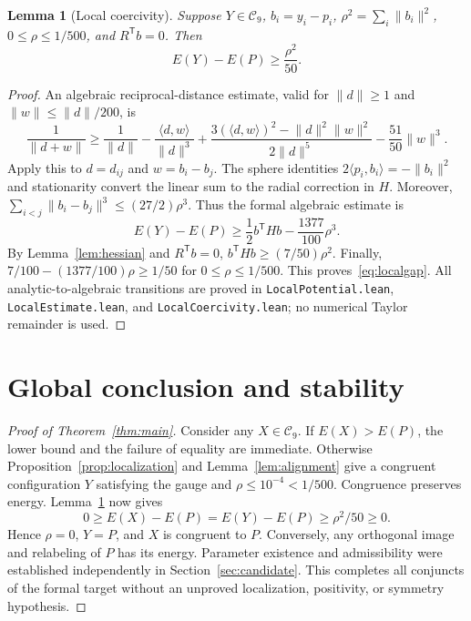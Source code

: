 \documentclass[11pt]{article}
\newtheorem{lemma}[theorem]{Lemma}
\theoremstyle{remark}
\newcommand{\ip}[2]{\langle #1,#2\rangle}
\newcommand{\norm}[1]{\lVert #1\rVert}
\newcommand{\pathcode}[1]{\nolinkurl{#1}}
\begin{document}
\begin{lemma}[Local coercivity]\label{lem:coercivity}
Suppose $Y\in\mathcal C_9$, $b_i=y_i-p_i$, $\rho^2=\sum_i\norm{b_i}^2$,
$0\le\rho\le1/500$, and $R^{\mathsf T}b=0$. Then
\begin{equation}\label{eq:localgap}
 E(Y)-E(P)\ge\frac{\rho^2}{50}.
\end{equation}
\end{lemma}
\begin{proof}
An algebraic reciprocal-distance estimate, valid for $\norm d\ge1$ and
$\norm w\le\norm d/200$, is
\[
 \frac1{\norm{d+w}}\ge\frac1{\norm{d}}-\frac{\ip{d}{w}}{\norm{d}^3}
 +\frac{3(\ip{d}{w})^2-\norm{d}^2\norm{w}^2}{2\norm{d}^5}
 -\frac{51}{50}\norm{w}^3.
\]
Apply this to $d=d_{ij}$ and $w=b_i-b_j$. The sphere identities
$2\ip{p_i}{b_i}=-\norm{b_i}^2$ and stationarity convert the linear sum to
the radial correction in $H$. Moreover,
$\sum_{i<j}\norm{b_i-b_j}^3\le(27/2)\rho^3$.
Thus the formal algebraic estimate is
\[
 E(Y)-E(P)\ge\frac12b^{\mathsf T}Hb-\frac{1377}{100}\rho^3.
\]
By Lemma~\ref{lem:hessian} and $R^{\mathsf T}b=0$,
$b^{\mathsf T}Hb\ge(7/50)\rho^2$. Finally,
$7/100-(1377/100)\rho\ge1/50$ for $0\le\rho\le1/500$.
This proves~\eqref{eq:localgap}. All analytic-to-algebraic transitions are
proved in \pathcode{LocalPotential.lean}, \pathcode{LocalEstimate.lean}, and
\pathcode{LocalCoercivity.lean}; no numerical Taylor remainder is used.
\end{proof}

\section{Global conclusion and stability}
\begin{proof}[Proof of Theorem~\ref{thm:main}]
Consider any $X\in\mathcal C_9$. If $E(X)>E(P)$, the lower bound and the
failure of equality are immediate. Otherwise Proposition~\ref{prop:localization}
and Lemma~\ref{lem:alignment} give a congruent configuration $Y$ satisfying
the gauge and $\rho\le10^{-4}<1/500$. Congruence preserves energy.
Lemma~\ref{lem:coercivity} now gives
\[
 0\ge E(X)-E(P)=E(Y)-E(P)\ge\rho^2/50\ge0.
\]
Hence $\rho=0$, $Y=P$, and $X$ is congruent to $P$. Conversely, any orthogonal
image and relabeling of $P$ has its energy. Parameter existence and
admissibility were established independently in Section~\ref{sec:candidate}.
This completes all conjuncts of the formal target without an unproved
localization, positivity, or symmetry hypothesis.
\end{proof}
\end{document}

